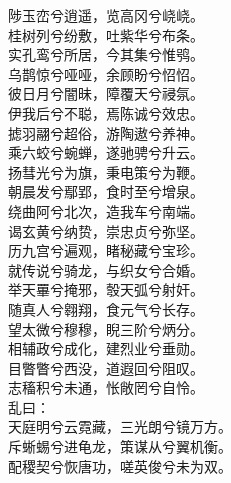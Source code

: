\documentclass[]{article}
\begin{document}
陟玉峦兮逍遥，览高冈兮峣峣。\\
桂树列兮纷敷，吐紫华兮布条。\\
实孔鸾兮所居，今其集兮惟鸮。\\
乌鹊惊兮哑哑，余顾盼兮怊怊。\\
彼日月兮闇昧，障覆天兮祲氛。\\
伊我后兮不聪，焉陈诚兮效忠。\\
摅羽翮兮超俗，游陶遨兮养神。\\
乘六蛟兮蜿蝉，遂驰骋兮升云。\\
扬彗光兮为旗，秉电策兮为鞭。\\
朝晨发兮鄢郢，食时至兮增泉。\\
绕曲阿兮北次，造我车兮南端。\\
谒玄黄兮纳贽，崇忠贞兮弥坚。\\
历九宫兮遍观，睹秘藏兮宝珍。\\
就传说兮骑龙，与织女兮合婚。\\
举天罼兮掩邪，彀天弧兮射奸。\\
随真人兮翱翔，食元气兮长存。\\
望太微兮穆穆，睨三阶兮炳分。\\
相辅政兮成化，建烈业兮垂勋。\\
目瞥瞥兮西没，道遐回兮阻叹。\\
志稸积兮未通，怅敞罔兮自怜。\\
乱曰：\\
天庭明兮云霓藏，三光朗兮镜万方。\\
斥蜥蜴兮进龟龙，策谋从兮翼机衡。\\
配稷契兮恢唐功，嗟英俊兮未为双。
\end{document}
